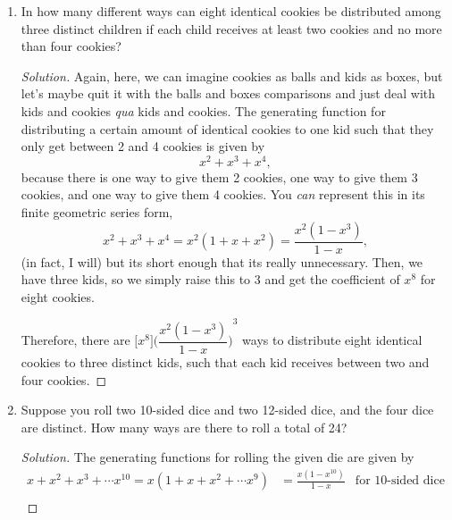 \documentclass{article}
\newenvironment{solution}
  {\renewcommand\qedsymbol{$\blacksquare$}\begin{proof}[Solution]}
  {\end{proof}}
\begin{document}
\begin{enumerate}
\begin{solution}
\begin{align*}
            x + x^3 + x^5 + \cdots = x(1 + x^2 + x^4 + \cdots) &= \frac{x}{1-x^2} &\text{for odd-numbered solutions}
        \end{align*} 
        We raise both of these to 5 for each possible $x_i$ we can place our integers into. Then, we multiply them together and evaluate the coefficient of $x^{50}$.\par 
        Thereofre, there are $\big[x^{50}\big] {\bigg(\dfrac{x^2}{1-x^2}\bigg)}^5 {\bigg(\dfrac{x}{1-x^2}\bigg)}^5 $ ways to solve this problem.
    \end{solution} 
    \item In how many different ways can eight identical cookies be distributed among three distinct
    children if each child receives at least two cookies and no more than four cookies?\begin{solution}
        Again, here, we can imagine cookies as balls and kids as boxes, but let's maybe quit it with the balls and boxes comparisons and just deal with kids and cookies \textit{qua} kids and cookies. 
        The generating function for distributing a certain amount of identical cookies to one kid such that they only get between 2 and 4 cookies is given by\[
            x^2 + x^3 + x^4,    
        \] because there is one way to give them 2 cookies, one way to give them 3 cookies, and one way to give them 4 cookies. You \textit{can} represent 
        this in its finite geometric series form,\[
            x^2 + x^3 + x^4 = x^2(1+ x + x^2) = \frac{x^2(1-x^3)}{1-x},    
        \] (in fact, I will) but its short enough that its really unnecessary. Then, we have three kids, so we simply raise this to 3 and get the coefficient of $x^8$ for eight cookies.\par 
        Therefore, there are $\big[x^8\big] {\bigg(\dfrac{x^2(1-x^3)}{1-x}\bigg)}^3$ ways to distribute eight identical cookies to three distinct kids, such that each kid receives between two and four cookies. 
    \end{solution}
    \item Suppose you roll two 10-sided dice and two 12-sided dice, and the four dice are distinct.
    How many ways are there to roll a total of 24?\begin{solution} 
        The generating functions for rolling the given die are given by\begin{align*} 
            x + x^2 + x^3 + \cdots x^{10} = x(1 + x + x^2 + \cdots x^9) &= \frac{x(1-x^{10})}{1-x} &\text{for 10-sided dice} \\ 

\end{align*}
\end{solution}
\end{enumerate}
\end{document}
